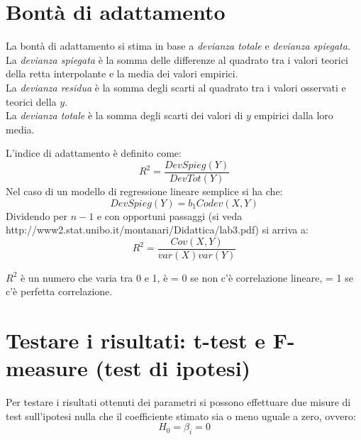 \section{Bontà di adattamento}
La bontà di adattamento si stima in base a \textit{devianza totale} e
\textit{devianza spiegata}.\\
La \textit{devianza spiegata} è la somma delle differenze al quadrato tra i valori teorici della retta interpolante e la media dei valori empirici.\\
La \textit{devianza residua} è la somma degli scarti al quadrato tra i valori osservati e teorici della $y$. \\
La \textit{devianza totale} è la somma degli scarti dei valori di $y$ empirici dalla loro media.

L'indice di adattamento è definito come:
\begin{equation}
R^2 = \frac{DevSpieg(Y)}{DevTot(Y)}
\end{equation}
Nel caso di un modello di regressione lineare semplice si ha che:
\begin{equation}
DevSpieg(Y) = b_1 Codev(X, Y)
\end{equation}
Dividendo per $n-1$ e con opportuni passaggi (si veda http://www2.stat.unibo.it/montanari/Didattica/lab3.pdf) si arriva a:
\begin{equation}
R^2 = \frac{Cov(X, Y)}{var(X)var(Y)}
\end{equation}

$R^2$ è un numero che varia tra 0 e 1, è = 0 se non c'è correlazione lineare, = 1 se c'è perfetta correlazione.

\section{Testare i risultati: t-test e F-measure (test di ipotesi)}
Per testare i risultati ottenuti dei parametri si possono effettuare due misure di test sull'ipotesi nulla che il coefficiente stimato sia o meno uguale a zero, ovvero:
\begin{equation}
H_0 = \beta_i = 0
\end{equation}

